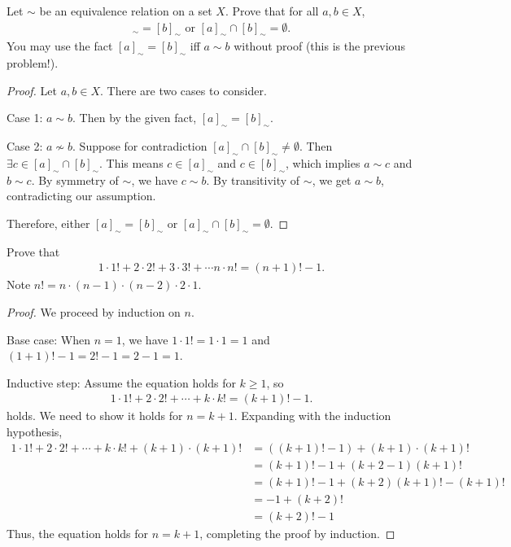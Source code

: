 \documentclass[12pt]{article}
\begin{document}
\begin{problem}
Let $\sim$ be an equivalence relation on a set $X$. Prove that for all $a,b \in X$, 
\begin{align*}
[a]_\sim = [b]_\sim \text{ or } [a]_\sim \cap [b]_\sim = \emptyset.
\end{align*}
You may use the fact $[a]_\sim = [b]_\sim$ iff $a \sim b$ without proof (this is the previous problem!).

\begin{proof}
Let $a, b \in X$. There are two cases to consider.

Case 1: $a \sim b$. Then by the given fact, $[a]_\sim = [b]_\sim$.

Case 2: $a \not\sim b$. Suppose for contradiction $[a]_\sim \cap [b]_\sim \neq \emptyset$. Then $\exists c \in [a]_\sim \cap [b]_\sim$. This means $c \in [a]_\sim$ and $c \in [b]_\sim$, which implies $a \sim c$ and $b \sim c$. By symmetry of $\sim$, we have $c \sim b$. By transitivity of $\sim$, we get $a \sim b$, contradicting our assumption.

Therefore, either $[a]_\sim = [b]_\sim$ or $[a]_\sim \cap [b]_\sim = \emptyset$.
\end{proof}
\end{problem}

\begin{problem}
Prove that
\begin{align*}
1 \cdot 1! + 2 \cdot 2! + 3 \cdot 3! + \cdots n \cdot n! = (n + 1)! - 1.
\end{align*}
Note $n! = n \cdot (n-1) \cdot (n-2) \cdot 2 \cdot 1$.

\begin{proof}
We proceed by induction on $n$.

Base case: When $n = 1$, we have $1 \cdot 1! = 1 \cdot 1 = 1$ and $(1 + 1)! - 1 = 2! - 1 = 2 - 1 = 1$. 

Inductive step: Assume the equation holds for $k \geq 1$, so
\begin{align*}
    1 \cdot 1! + 2 \cdot 2! + \cdots + k \cdot k! = (k+1)! - 1.
\end{align*}
holds. We need to show it holds for $n = k + 1$. Expanding with the induction hypothesis,
\begin{align*}
    1 \cdot 1! + 2 \cdot 2! + \cdots + k \cdot k! + (k+1) \cdot (k+1)! &= ((k+1)! - 1) + (k+1) \cdot (k+1)!\\
    &= (k+1)! - 1 + (k+2-1)(k+1)!\\
    &= (k+1)! - 1 + (k+2)(k+1)! - (k+1)!\\
    &= -1 + (k+2)!\\
    &= (k+2)! - 1
\end{align*}
Thus, the equation holds for $n = k + 1$, completing the proof by induction.
\end{proof}
\end{problem}
\end{document}
